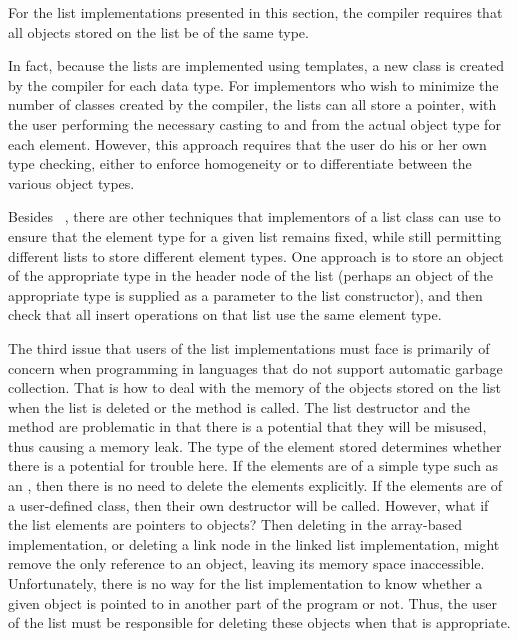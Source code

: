 For the list implementations presented in this section,
the compiler requires that all objects stored on the list be of the
same type.
{In fact, because the lists are implemented using
templates, a new class 
is created by the compiler for each data type.
For implementors who wish to minimize the number of classes created by 
the compiler, the lists can all store a  pointer, with the 
user performing the necessary casting to and from the actual object
type for each element.
However, this approach requires that the user do his or her own type
checking, either to enforce homogeneity or to differentiate between
the various object types.

}{}
Besides \Lang\ \Gens,
there are other techniques that implementors of a
list class can use to ensure that the element type for a given list
remains fixed,
while still permitting different lists to store different element
types.
One approach is to store an object of the appropriate type in the
header node of the list (perhaps an object of the appropriate type is
supplied as a parameter to the list constructor), and then check that
all insert operations on that list use the same element type.

The third issue that users of the list implementations must face is
primarily of concern when programming in languages that do not support
automatic garbage collection.
That is
how to deal with the memory of the objects stored on the list
when the list is deleted or the  method is called.
The list destructor and the  method are
problematic in that there is a potential that they will
be
{misused, thus causing a memory leak.
The type of the element stored determines whether there is a potential
for trouble here.
If the elements are of a simple type such as an , then there
is no need to delete the elements explicitly.
If the elements are of a user-defined class, then their own destructor
will be called.
However, what if the list elements are pointers to objects?
Then deleting}{}
 in the array-based implementation,
or deleting a link node in the linked list implementation,
might remove the only reference to an object, leaving its memory space
inaccessible.
Unfortunately, there is no way for the list implementation to know
whether a given object is pointed to in another part of the program or
not.
Thus, the user of the list must be responsible for
deleting these objects when that is appropriate.

